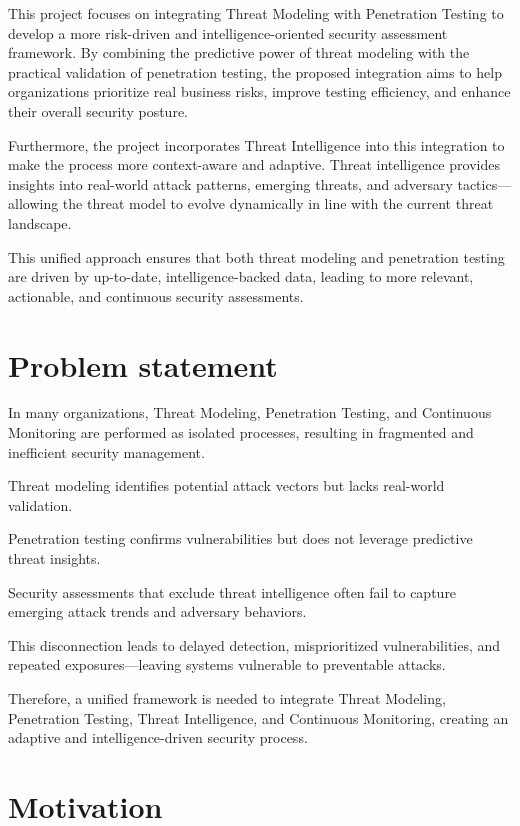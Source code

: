 \documentclass[12pt,a4paper]{report}
\begin{document}
This project focuses on integrating Threat Modeling with Penetration Testing to develop a more risk-driven and intelligence-oriented security assessment framework.
 By combining the predictive power of threat modeling with the practical validation of penetration testing, the proposed integration aims to help organizations prioritize real business risks, improve testing efficiency, and enhance their overall security posture.

Furthermore, the project incorporates Threat Intelligence into this integration to make the process more context-aware and adaptive. Threat intelligence provides insights into real-world attack patterns, emerging threats, and adversary tactics—allowing the threat model to evolve dynamically in line with the current threat landscape.

This unified approach ensures that both threat modeling and penetration testing are driven by up-to-date, intelligence-backed data, leading to more relevant, actionable, and continuous security assessments.

\section{Problem statement}

In many organizations, Threat Modeling, Penetration Testing, and Continuous Monitoring are performed as isolated processes, resulting in fragmented and inefficient security management.

Threat modeling identifies potential attack vectors but lacks real-world validation.

Penetration testing confirms vulnerabilities but does not leverage predictive threat insights.

Security assessments that exclude threat intelligence often fail to capture emerging attack trends and adversary behaviors.

This disconnection leads to delayed detection, misprioritized vulnerabilities, and repeated exposures—leaving systems vulnerable to preventable attacks.

Therefore, a unified framework is needed to integrate Threat Modeling, Penetration Testing, Threat Intelligence, and Continuous Monitoring, creating an adaptive and intelligence-driven security process.

\section{Motivation}
\end{document}
